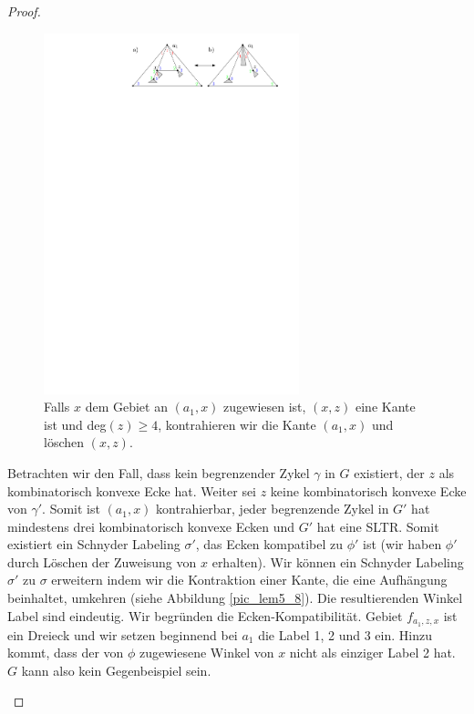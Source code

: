 \begin{proof}
\begin{description}[leftmargin =0pt, font = \rmfamily ,listparindent=\parindent,parsep=0pt]
\begin{figure}[h]
	\centering
	  \includegraphics[width=0.66\textwidth]{lem5_7.pdf}
    	\caption{Falls $x$ dem Gebiet an $(a_1,x)$ zugewiesen ist, $(x,z)$ eine Kante ist und deg$(z)\geq 4$, kontrahieren wir die Kante $(a_1,x)$ und löschen $(x,z)$.}
    	\label{pic_lem5_7}
\end{figure}

Betrachten wir den Fall, dass kein begrenzender Zykel $\gamma$ in $G$ existiert, der $z$ als kombinatorisch konvexe Ecke hat. Weiter sei $z$ keine kombinatorisch konvexe Ecke von $\gamma'$. Somit ist $(a_1,x)$ kontrahierbar, jeder begrenzende Zykel in $G'$ hat mindestens drei kombinatorisch konvexe Ecken und $G'$ hat eine SLTR. Somit existiert ein Schnyder Labeling $\sigma'$, das Ecken kompatibel zu $\phi'$ ist (wir haben $\phi'$ durch Löschen der Zuweisung von $x$ erhalten). Wir können ein Schnyder Labeling $\sigma'$ zu $\sigma$ erweitern indem wir die Kontraktion einer Kante, die eine Aufhängung beinhaltet, umkehren (siehe Abbildung \ref{pic_lem5_8}). Die resultierenden Winkel Label sind eindeutig. Wir begründen die Ecken-Kompatibilität. Gebiet $f_{a_1,z,x}$ ist ein Dreieck und wir setzen beginnend bei $a_1$ die Label 1, 2 und 3 ein. Hinzu kommt, dass der von $\phi$ zugewiesene Winkel von $x$ nicht als einziger Label 2 hat. $G$ kann also kein Gegenbeispiel sein.


\end{description}
\end{proof}
